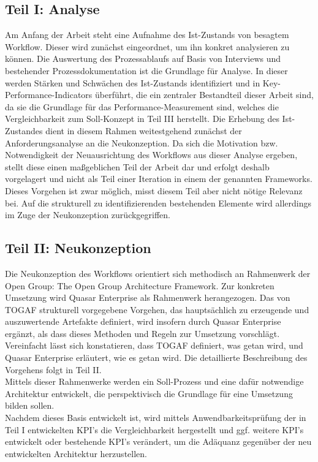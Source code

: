 \subsection{Teil I: Analyse}

Am Anfang der Arbeit steht eine Aufnahme des Ist-Zustands von besagtem Workflow. Dieser wird zunächst eingeordnet, um ihn konkret analysieren zu können. 
Die Auswertung des Prozessablaufs auf Basis von Interviews und bestehender Prozessdokumentation ist die Grundlage für Analyse. 
In dieser werden Stärken und Schwächen des Ist-Zustands identifiziert und in Key-Performance-Indicators überführt, die ein zentraler Bestandteil dieser Arbeit sind, da sie die Grundlage für das Performance-Measurement sind, welches die Vergleichbarkeit zum Soll-Konzept in Teil III herstellt.
Die Erhebung des Ist-Zustandes dient in diesem Rahmen weitestgehend zunächst der Anforderungsanalyse an die Neukonzeption. 
Da sich die Motivation bzw. Notwendigkeit der Neuausrichtung des Workflows aus dieser Analyse ergeben, stellt diese einen maßgeblichen Teil der Arbeit dar und erfolgt deshalb vorgelagert und nicht als Teil einer Iteration in einem der genannten Frameworks.
Dieses Vorgehen ist zwar möglich, misst diesem Teil aber nicht nötige Relevanz bei.
Auf die strukturell zu identifizierenden bestehenden Elemente wird allerdings im Zuge der Neukonzeption zurückgegriffen.

\subsection{Teil II: Neukonzeption}

Die Neukonzeption des Workflows orientiert sich methodisch an Rahmenwerk der Open Group: The Open Group Architecture Framework. 
Zur konkreten Umsetzung wird Quasar Enterprise als Rahmenwerk herangezogen. 
Das von TOGAF strukturell vorgegebene Vorgehen, das hauptsächlich zu erzeugende und auszuwertende Artefakte definiert, wird insofern durch Quasar Enterprise ergänzt, als dass dieses Methoden und Regeln zur Umsetzung vorschlägt. 
Vereinfacht lässt sich konstatieren, dass TOGAF definiert, was getan wird, und Quasar Enterprise erläutert, wie es getan wird. 
Die detaillierte Beschreibung des Vorgehens folgt in Teil II.\\
Mittels dieser Rahmenwerke werden ein Soll-Prozess und eine dafür notwendige Architektur entwickelt, die perspektivisch die Grundlage für eine Umsetzung bilden sollen.\\
Nachdem dieses Basis entwickelt ist, wird mittels Anwendbarkeitsprüfung der in Teil I entwickelten KPI's die Vergleichbarkeit hergestellt und ggf. weitere KPI's entwickelt oder bestehende KPI's verändert, um die Adäquanz gegenüber der neu entwickelten Architektur herzustellen.\\

